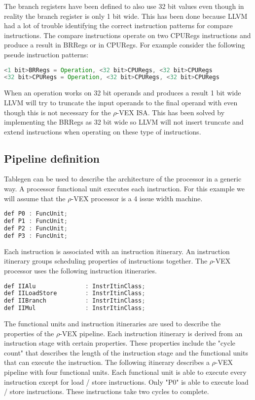 The branch registers have been defined to also use 32 bit values even though in reality the branch register is only 1 bit wide. This has been done because LLVM had a lot of trouble identifying the correct instruction patterns for compare instructions. The compare instructions operate on two CPURegs instructions and produce a result in BRRegs or in CPURegs. For example consider the following pseude instruction patterns:

\begin{lstlisting}[language=java] 
<1 bit>BRRegs = Operation, <32 bit>CPURegs, <32 bit>CPURegs
<32 bit>CPURegs = Operation, <32 bit>CPURegs, <32 bit>CPURegs
\end{lstlisting}

When an operation works on 32 bit operands and produces a result 1 bit wide LLVM will try to truncate the input operands to the final operand with even though this is not necessary for the $\rho$-VEX ISA. This has been solved by implementing the BRRegs as 32 bit wide so LLVM will not insert truncate and extend instructions when operating on these type of instructions.

\subsection{Pipeline definition}
Tablegen can be used to describe the architecture of the processor in a generic way. A processor functional unit executes each instruction. For this example we will assume that the $\rho$-VEX processor is a 4 issue width machine.

\begin{lstlisting}[language=java] 
def P0 : FuncUnit;
def P1 : FuncUnit;
def P2 : FuncUnit;
def P3 : FuncUnit;
\end{lstlisting}

Each instruction is associated with an instruction itinerary. An instruction itinerary groups scheduling properties of instructions together. The $\rho$-VEX processor uses the following instruction itineraries.

\begin{lstlisting}[language=java] 
def IIAlu              : InstrItinClass;
def IILoadStore        : InstrItinClass;
def IIBranch           : InstrItinClass;
def IIMul              : InstrItinClass;
\end{lstlisting}

The functional units and instruction itineraries are used to describe the properties of the $\rho$-VEX pipeline. Each instruction itinerary is derived from an instruction stage with certain properties. These properties include the "cycle count" that describes the length of the instruction stage and the functional units that can execute the instruction. The following itinerary describes a $\rho$-VEX pipeline with four functional units. Each functional unit is able to execute every instruction except for load / store instructions. Only "P0" is able to execute load / store instructions. These instructions take two cycles to complete.

